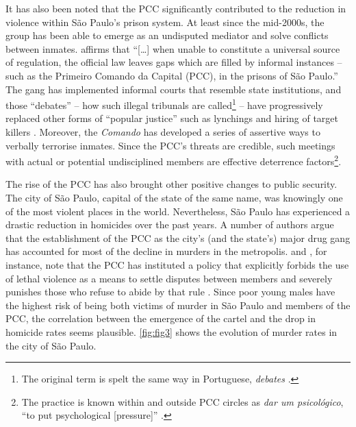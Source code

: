 It has also been noted that the PCC significantly contributed to the reduction in violence within S\~{a}o Paulo's prison system. At least since the mid-2000s, the group has been able to emerge as an undisputed mediator and solve conflicts between inmates. \citet[83]{dias2009ocupando} affirms that ``[\dots] when unable to constitute a universal source of regulation, the official law leaves gaps which are filled by informal instances -- such as the Primeiro Comando da Capital (PCC), in the prisons of S\~{a}o Paulo.'' The gang has implemented informal courts that resemble state institutions, and those ``debates'' -- how such illegal tribunals are called\footnote{The original term is spelt the same way in Portuguese, \textit{debates} \citep[3]{feltran2012metodos}.} -- have progressively replaced other forms of ``popular justice'' such as lynchings and hiring of target killers \citep[3]{feltran2012metodos}. Moreover, the \textit{Comando} has developed a series of assertive ways to verbally terrorise inmates. Since the PCC's threats are credible, such meetings with actual or potential undisciplined members are effective deterrence factors\footnote{The practice is known within and outside PCC circles as \textit{dar um psicol\'{o}gico}, ``to put psychological [pressure]'' \citep{marques2010liderancca}.}.

The rise of the PCC has also brought other positive changes to public security. The city of S\~{a}o Paulo, capital of the state of the same name, was knowingly one of the most violent places in the world. Nevertheless, S\~{a}o Paulo has experienced a drastic reduction in homicides over the past years. A number of authors argue that the establishment of the PCC as the city's (and the state's) major drug gang has accounted for most of the decline in murders in the metropolis. \cite{biondi2010junto} and \cite{dias2011pulverizaccao}, for instance, note that the PCC has instituted a policy that explicitly forbids the use of lethal violence as a means to settle disputes between members and severely punishes those who refuse to abide by that rule \citep{jozino2004cobras}. Since poor young males have the highest risk of being both victims of murder in S\~{a}o Paulo and members of the PCC, the correlation between the emergence of the cartel and the drop in homicide rates seems plausible. \autoref{fig:fig3} shows the evolution of murder rates in the city of S\~{a}o Paulo. 




